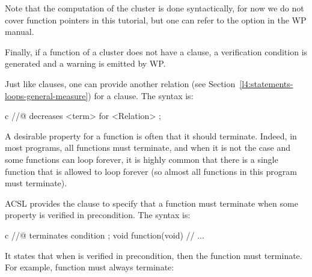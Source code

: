 

\begin{Information}
  Note that the computation of the cluster is done syntactically, for now we do
  not cover function pointers in this tutorial, but one can refer to the option
   in the WP manual.
\end{Information}


Finally, if a function of a cluster does not have a 
clause, a  verification condition is generated
and a warning is emitted by WP.






\begin{Information}
  Just like  clauses, one can provide another relation
  (see Section~\ref{l4:statements-loops-general-measure}) for a
   clause. The syntax is:


  \begin{CodeBlock}{c}
//@ decreases <term> for <Relation> ;
\end{CodeBlock}
\end{Information}




A desirable property for a function is often that it should terminate. Indeed,
in most programs, all functions must terminate, and when it is not the case and
some functions can loop forever, it is highly common that there is a single
function that is allowed to loop forever (so almost all functions in this
program must terminate).




ACSL provides the  clause to specify that a function must
terminate when some property is verified in precondition. The syntax is:


\begin{CodeBlock}{c}
//@ terminates condition ;
void function(void){
  // ...
}
\end{CodeBlock}


It states that when  is verified in precondition, then
the function must terminate. For example, function  must always
terminate:




